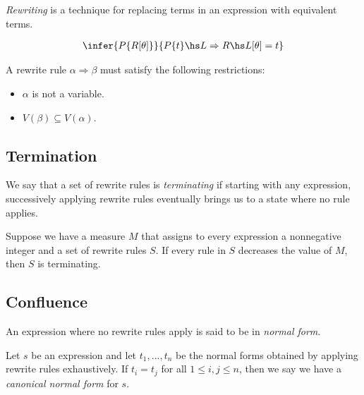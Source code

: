 \documentclass{article}
\begin{document}
\begin{definition}
    \emph{Rewriting} is a technique for replacing terms in an expression with equivalent terms.
\end{definition}

\begin{theorem}
    \begin{align*}
        \infer{P\{R[\theta]\}}{P\{t\}\hs L\Rightarrow R\hs L[\theta]=t}
    \end{align*}
\end{theorem}

\begin{definition}
    A rewrite rule $\alpha\Rightarrow\beta$ must satisfy the following restrictions:
    \begin{itemize}
        \item $\alpha$ is not a variable.
        \item $V(\beta)\subseteq V(\alpha)$.
    \end{itemize}
\end{definition}

\subsection{Termination}

\begin{definition}
    We say that a set of rewrite rules is \emph{terminating} if starting with any expression,
    successively applying rewrite rules eventually brings us to a state where no rule applies.
\end{definition}

\begin{theorem}
    Suppose we have a measure $M$ that assigns to every expression a nonnegative integer and
    a set of rewrite rules $S$. If every rule in $S$ decreases the value of $M$, then $S$
    is terminating.
\end{theorem}

\subsection{Confluence}

\begin{definition}
    An expression where no rewrite rules apply is said to be in \emph{normal form}.
\end{definition}

\begin{definition}
    Let $s$ be an expression and let $t_1, ..., t_n$ be the normal forms obtained by
    applying rewrite rules exhaustively. If $t_i=t_j$ for all $1\leq i,j\leq n$, then we
    say we have a \emph{canonical normal form} for $s$.
\end{definition}
\end{document}
